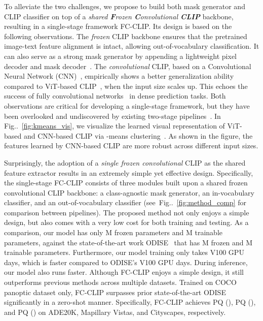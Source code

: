 \documentclass{article}
\makeatletter
\DeclareRobustCommand\onedot{\futurelet\@let@token\@onedot}
\def\@onedot{\ifx\@let@token.\else.\null\fi\xspace}
\newcommand{\figref}[1]{Fig\onedot~\ref{#1}}
\newcommand{\modelname}{FC-CLIP\xspace}
\makeatother
\begin{document}
To alleviate the two challenges, we propose to build both mask generator and CLIP classifier on top of a \textit{shared \textbf{F}rozen \textbf{C}onvolutional \textbf{CLIP}} backbone, resulting in a single-stage framework \modelname.
Its design is based on the following observations.
The \textit{frozen} CLIP backbone ensures that the pretrained image-text feature alignment is intact, allowing out-of-vocabulary classification.
It can also serve as a strong mask generator by appending a lightweight pixel decoder and mask decoder~\cite{cheng2021masked, yu2022k}.
The \textit{convolutional} CLIP, based on a Convolutional Neural Network (CNN)~\cite{lecun1998gradient}, empirically
shows a better generalization ability compared to ViT-based CLIP~\cite{dosovitskiy2020image}, when the input size scales up. 
This echoes the success of fully convolutional networks~\cite{long2014fully} in dense prediction tasks.
Both observations are critical for developing a single-stage framework, but they have been overlooked and undiscovered by existing two-stage pipelines~\cite{ding2022open,xu2023open}.
In \figref{fig:kmeans_vis}, we visualize the learned visual representation of ViT-based and CNN-based CLIP via -means clustering~\cite{lloyd1982least}.
As shown in the figure, the features learned by CNN-based CLIP are more robust across different input sizes.

Surprisingly, the adoption of a \textit{single frozen convolutional} CLIP as the shared feature extractor results in an extremely simple yet effective design.
Specifically, the single-stage \modelname consists of three modules built upon a shared frozen convolutional CLIP backbone: a class-agnostic mask generator, an in-vocabulary classifier, and an out-of-vocabulary classifier (see~\figref{fig:method_comp} for comparison between pipelines).
The proposed method not only enjoys a simple design, but also comes with a very low cost for both training and testing.
As a comparison, our model has only M frozen parameters and M trainable parameters, against the state-of-the-art work ODISE~\cite{xu2023open} that has M frozen and M trainable parameters.
Furthermore, our model training only takes  V100 GPU days, which is  faster compared to ODISE's  V100 GPU days.
During inference, our model also runs  faster. 
Although \modelname enjoys a simple design, it still outperforms previous methods across multiple datasets. Trained on COCO panoptic dataset only, \modelname surpasses prior state-of-the-art ODISE~\cite{xu2023open} significantly in a zero-shot manner. Specifically, \modelname achieves  PQ (),  PQ (), and  PQ () on ADE20K, Mapillary Vistas, and Cityscapes, respectively.
\end{document}
